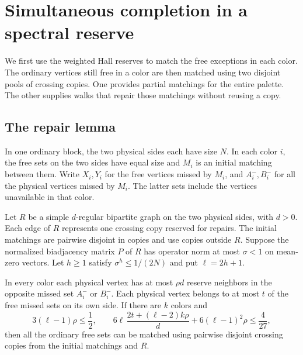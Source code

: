 \section{Simultaneous completion in a spectral reserve}\label{sec:spectral-reserve}

We first use the weighted Hall reserves to match the free exceptions in each color. The ordinary vertices still free in a color are then matched using two disjoint pools of crossing copies. One provides partial matchings for the entire palette. The other supplies walks that repair those matchings without reusing a copy.

\subsection{The repair lemma}

In one ordinary block, the two physical sides each have size \(N\). In each color \(i\), the free sets on the two sides have equal size and \(M_i\) is an initial matching between them. Write \(X_i,Y_i\) for the free vertices missed by \(M_i\), and \(A_i^-,B_i^-\) for all the physical vertices missed by \(M_i\). The latter sets include the vertices unavailable in that color.

\begin{lemma}\label{lem:spectral-repair}
Let \(R\) be a simple \(d\)-regular bipartite graph on the two physical sides, with \(d>0\). Each edge of \(R\) represents one crossing copy reserved for repairs. The initial matchings are pairwise disjoint in copies and use copies outside \(R\). Suppose the normalized biadjacency matrix \(P\) of \(R\) has operator norm at most \(\sigma<1\) on mean-zero vectors. Let \(h\ge1\) satisfy \(\sigma^h\le1/(2N)\) and put \(\ell=2h+1\).

In every color each physical vertex has at most \(\rho d\) reserve neighbors in the opposite missed set \(A_i^-\) or \(B_i^-\). Each physical vertex belongs to at most \(t\) of the free missed sets on its own side. If there are \(k\) colors and
\[
 3(\ell-1)\rho\le\frac12,\qquad
 6\ell\,\frac{2t+(\ell-2)k\rho}{d}+6(\ell-1)^2\rho\le\frac{4}{27},
 \tag{P}\label{eq:spectral-repair}
\]
then all the ordinary free sets can be matched using pairwise disjoint crossing copies from the initial matchings and \(R\).
\end{lemma}

